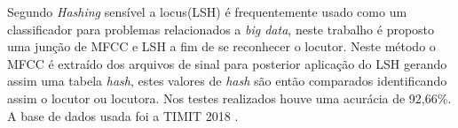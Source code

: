 \begin{myenv}{1.5}
		\par Segundo \cite{8396208} \textit{Hashing} sensível a locus(LSH) é frequentemente usado como um classificador para problemas relacionados a \textit{big data}, neste trabalho é proposto uma junção de MFCC e LSH a fim de se reconhecer o locutor. Neste método o MFCC é extraído dos arquivos de sinal para posterior aplicação do LSH gerando assim uma tabela \textit{hash}, estes valores de \textit{hash} são então comparados identificando assim o locutor ou locutora. Nos testes realizados houve uma acurácia de 92,66\%. A base de dados usada foi a TIMIT 2018 \cite{TIMIT2018}. 

	\end{myenv}